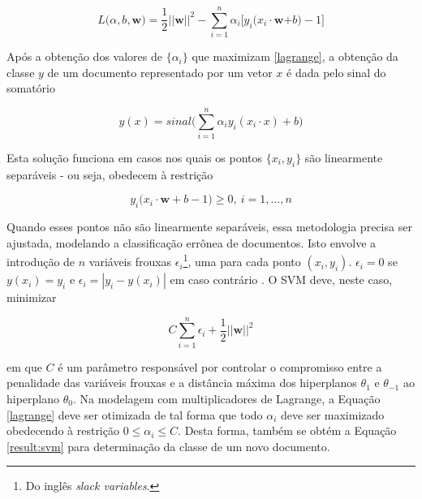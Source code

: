 \begin{equation}
\label{lagrange}
\ensuremath{L(\alpha, b,}\textbf{w}\ensuremath{) = \frac{1}{2} ||}\textbf{w}\ensuremath{||^2 - \sum_{i = 1}^n \alpha_i\big[y_i(x_i \cdot}\textbf{w}\ensuremath{+ b) -1 \big]} %
\end{equation}

Após a obtenção dos valores de \ensuremath{\{\alpha_i\}} que maximizam \ref{lagrange}, a obtenção da classe \ensuremath{y} de um documento representado por um vetor \ensuremath{x} é dada pelo sinal do somatório

\begin{equation}
\label{result:svm}
\ensuremath{y(x) = sinal\bigg(\sum_{i = 1}^n \alpha_iy_i(x_i \cdot x) + b\bigg)} %
\end{equation}

Esta solução funciona em casos nos quais os pontos \ensuremath{\{x_i, y_i\}} são linearmente separáveis - ou seja, obedecem à restrição

\begin{equation}
\label{restr2:svm}
\ensuremath{y_i(x_i \cdot} \textbf{w} + \ensuremath{b -1) \geq 0,\ i = 1,...,n}
\end{equation}

Quando esses pontos não são linearmente separáveis, essa metodologia precisa ser ajustada, modelando a classificação errônea de documentos. Isto envolve a introdução de \ensuremath{n} variáveis frouxas \ensuremath{\epsilon_i}\footnote{Do inglês \emph{slack variables}.}, uma para cada ponto \ensuremath{(x_i, y_i)}. \ensuremath{\epsilon_i = 0} se \ensuremath{y(x_i) = y_i} e \ensuremath{\epsilon_i = |y_i - y(x_i)|} em caso contrário \cite{bishop}. O SVM deve, neste caso, minimizar

\begin{equation}
\label{nonlin:svm}
\ensuremath{C\sum_{i=1}^n\epsilon_i + \frac{1}{2}||}\textbf{w}\ensuremath{||^2}
\end{equation}

em que \ensuremath{C} é um parâmetro responsável por controlar o compromisso entre a penalidade das variáveis frouxas e a distância máxima dos hiperplanos \ensuremath{\theta_1} e \ensuremath{\theta_{-1}} ao hiperplano \ensuremath{\theta_0}. Na modelagem com multiplicadores de Lagrange, a Equação \ref{lagrange} deve ser otimizada de tal forma que todo \ensuremath{\alpha_i} deve ser maximizado obedecendo à restrição \ensuremath{0 \leq \alpha_i \leq C}. Desta forma, também se obtém a Equação \ref{result:svm} para determinação da classe de um novo documento.

